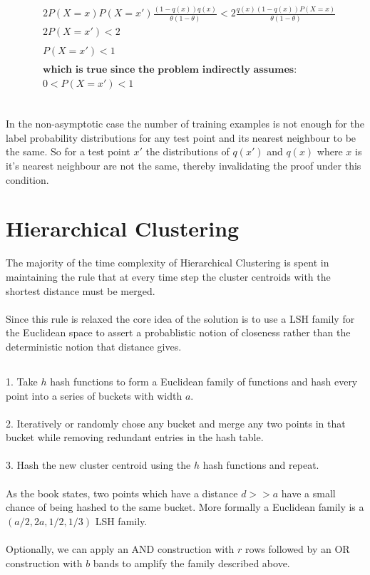 \documentclass[letterpaper]{article}
\begin{document}
\begin{align*}
&2P(X=x)P(X=x')\frac{(1-q(x))q(x)}{\theta(1-\theta)} < 2\frac{q(x)(1-q(x))P(X=x)}{\theta(1-\theta)}\\
&2P(X=x') < 2\\\\
&P(X=x') < 1\\\\
&\textbf{which is true since the problem indirectly assumes:}\\
&0 < P(X=x') < 1 \\
\end{align*}

\subsection{}

In the non-asymptotic case the number of training examples is not enough
for the label probability distributions for any test point and its nearest
neighbour to be the same. So for a test point  $x'$ the distributions of $q(x')$ and
$q(x)$ where $x$ is it's nearest neighbour are not the same, thereby invalidating the
proof under this condition.


\section{Hierarchical Clustering}

The majority of the time complexity of Hierarchical Clustering is spent in maintaining
the rule that at every time step the cluster centroids with the shortest distance must be 
merged.\\\\
Since this rule is relaxed the core idea of the solution is to use a LSH family for the
Euclidean space to assert a probablistic notion of closeness rather than the deterministic
notion that distance gives.

\subsection{}

1. Take $h$ hash functions to form a Euclidean family of functions and hash every point into
a series of buckets with width $a$.\\\\2. Iteratively or randomly chose any bucket and merge 
any two points in that bucket while removing redundant entries in the hash table.\\\\3. Hash the new cluster centroid using the $h$ hash functions and repeat.\\\\
As the book states, two points which have a distance $ d >> a$ have a small chance of being hashed
to the same bucket. More formally a Euclidean family is a $(a/2,2a,1/2,1/3)$ LSH family.\\\\
Optionally, we can apply an AND construction with $r$ rows followed by an OR construction 
with $b$ bands to amplify the family described above. 
\end{document}
